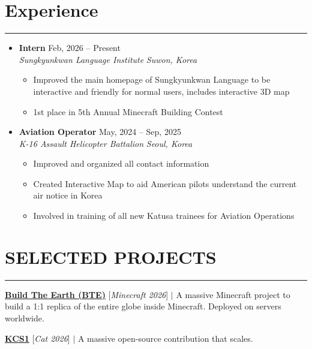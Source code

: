 \documentclass[letterpaper, 10pt]{article}
\begin{document}
\section*{Experience}
\hrule
\vspace{4pt}
\begin{itemize}
\item[]
\textbf{Intern} \hfill Feb, 2026 -- Present \\ %
\textit{\fontsize{13}{13}\selectfont Sungkyunkwan Language Institute}
\hfill \textit{Suwon, Korea}
\begin{itemize}
\item Improved the main homepage of Sungkyunkwan Language to be interactive and friendly for normal users, includes interactive 3D map
\item 1st place in 5th Annual Minecraft Building Contest 
\end{itemize}
\item[]

\textbf{Aviation Operator} \hfill May, 2024 -- Sep, 2025 \\ %
\textit{\fontsize{13}{13}\selectfont K-16 Assault Helicopter Battalion} 
\hfill \textit{Seoul, Korea}
\begin{itemize}
\item Improved and organized all contact information 
\item Created Interactive Map to aid American pilots understand the current air notice in Korea
\item Involved in training of all new Katusa trainees for Aviation Operations
\end{itemize}
\end{itemize}
\section*{SELECTED PROJECTS}
\hrule
\vspace{4pt} %

\noindent
\href{https://buildtheearth.net/}{\textbf{Build The Earth (BTE)}} [{\textit{Minecraft 2026}}] $|$ A massive Minecraft project to build a 1:1 replica of the entire globe inside Minecraft. Deployed on servers worldwide.

\smallskip %
\noindent
\href{https://media1.tenor.com/m/cRTQk6N_FxMAAAAC/swag-cat-swagbilli-cutecat-cats-cat-swag-ok-yooo-yo.gif}{\textbf{KCS1}} [{\textit{Cat 2026}}] $|$ A massive open-source contribution that scales.
\end{document}
